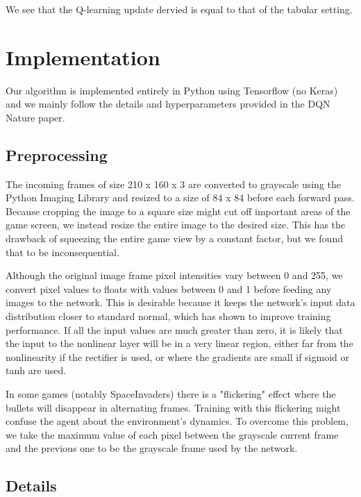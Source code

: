 \documentclass[letterpaper]{article}
\begin{document}
We see that the Q-learning update dervied is equal to that of the tabular setting.

\section{Implementation}

Our algorithm is implemented entirely in Python using Tensorflow (no Keras) and we mainly follow the details and hyperparameters provided in the DQN Nature paper.
\subsection{Preprocessing}
The incoming frames of size 210 x 160 x 3 are converted to grayscale using the Python Imaging Library and resized to a size of 84 x 84 before each forward pass. Because cropping the image to a square size might cut off important areas of the game screen, we instead resize the entire image to the desired size. This has the drawback of squeezing the entire game view by a constant factor, but we found that to be inconsequential.

Although the original image frame pixel intensities vary between 0 and 255, we convert pixel values to floats with values between 0 and 1 before feeding any images to the network. This is desirable because it keeps the network's input data distribution closer to standard normal, which has shown to improve training performance. If all the input values are much greater than zero, it is likely that the input to the nonlinear layer will be in a very linear region, either far from the nonlinearity if the rectifier is used, or where the gradients are small if sigmoid or tanh are used.

	In some games (notably SpaceInvaders) there is a "flickering" effect where the bullets will disappear in alternating frames. Training with this flickering might confuse the agent about the environment's dynamics. To overcome this problem, we take the maximum value of each pixel between the grayscale current frame and the previous one to be the grayscale frame used by the network.

\subsection{Details}
\end{document}
